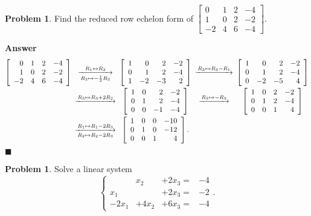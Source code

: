 \documentclass[12pt,letterpaper]{book}
\numberwithin{equation}{section}
\theoremstyle{definition}
\newtheorem{problem}[thm]{\textbf{Problem}}
\newenvironment{answer}{\noindent\textbf{Answer}}{\hfill$\blacksquare$\vspace{0.1in}}
\begin{document}
\begin{problem}\label{reduced example} Find the reduced row echelon form of $\left[\begin{array}{rrrr}0 & 1 & 2 & -4 \\ 1 & 0 & 2 & -2 \\ -2 & 4 & 6 & -4 \end{array}\right]$.
\end{problem}

\begin{answer}
$$\begin{CD}
\left[\begin{array}{rrrr}0 & 1 & 2 & -4 \\ 1 & 0 & 2 & -2 \\ -2 & 4 & 6 & -4 \end{array}\right] @>R_1\leftrightarrow R_2 > R_3\mapsto -\frac{1}{2}R_3>  \left[\begin{array}{rrrr}1 & 0 & 2 & -2 \\ 0 & 1 & 2 & -4 \\ 1 & -2 & -3 & 2 \end{array}\right] @>R_3\mapsto R_3-R_1 >>  \left[\begin{array}{rrrr}1 & 0 & 2 & -2 \\ 0 & 1 & 2 & -4 \\ 0 & -2 & -5 & 4 \end{array}\right]\\
 @>R_3\mapsto R_3+2R_2 >>  \left[\begin{array}{rrrr}1 & 0 & 2 & -2 \\ 0 & 1 & 2 & -4 \\ 0 & 0 & -1 & -4 \end{array}\right]
 @>R_3\mapsto -R_3 >>  \left[\begin{array}{rrrr}1 & 0 & 2 & -2 \\ 0 & 1 & 2 & -4 \\ 0 & 0 & 1 & 4 \end{array}\right]\\
 @>R_1\mapsto R_1-2R_3 >R_2\mapsto R_2-2R_3>  \left[\begin{array}{rrrr}1 & 0 & 0 & -10 \\ 0 & 1 & 0 & -12 \\ 0 & 0 & 1 & 4 \end{array}\right].
\end{CD}$$
\end{answer}

\begin{problem}
Solve a linear system $$\left\{\begin{array}{rrrr}
&x_2&+2x_3=&-4
\\ x_1&  &+2x_3=&-2 \\ -2x_1&+4x_2&+6x_3=&-4 \end{array}\right. .$$
\end{problem}
\end{document}
